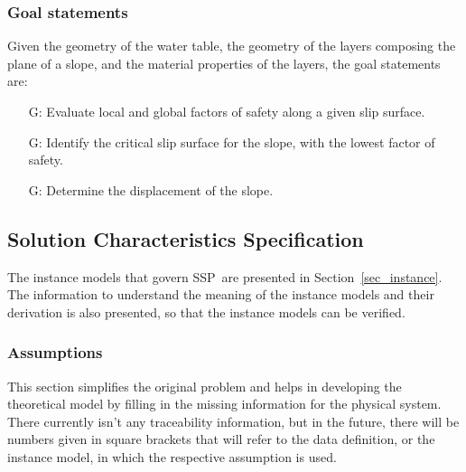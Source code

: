 \documentclass[12pt]{article}
\newcommand{\progname}{SSP}
\newcounter{goalnum} %
\begin{document}
\subsubsection{Goal statements}

Given the geometry of the water table, the geometry of the layers
composing the plane of a slope, and the material properties of the
layers, the goal statements are:

\begin{itemize}
\item [G\refstepcounter{goalnum}\thegoalnum: \label{G_FS}]
  {Evaluate local and global factors of safety along a given slip
    surface.}
  
\item [G\refstepcounter{goalnum}\thegoalnum: \label{G_Critical}]
  {Identify the critical slip surface for the slope, with the lowest
    factor of safety.}
  
\item [G\refstepcounter{goalnum}\thegoalnum: \label{G_Displacement}]
  {Determine the displacement of the slope.}
\end{itemize}

\subsection{Solution Characteristics Specification}

The instance models that govern \progname\ are presented in
Section~\ref{sec_instance}.  The information to understand the
meaning of the instance models and their derivation is also presented,
so that the instance models can be verified.

\subsubsection{Assumptions}
\label{Assumptions}
This section simplifies the original problem and helps in developing
the theoretical model by filling in the missing information for the
physical system.
There currently isn't any traceability information, but in the future, there will  be numbers given in square brackets that will refer to the
data definition, or the instance model, in which the respective
assumption is used.
\end{document}

